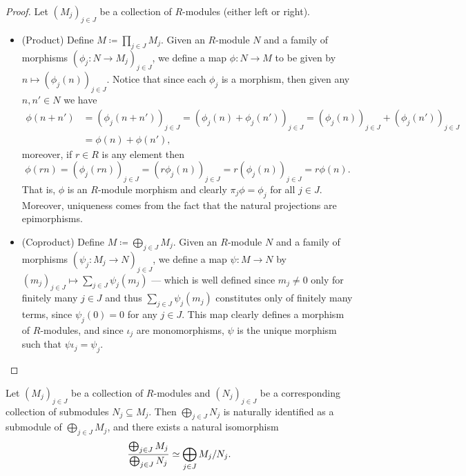 \begin{proof}
    Let \((M_j)_{j \in J}\) be a collection of \(R\)-modules (either left or
    right).
    \begin{itemize}\setlength\itemsep{0em}
        \item (Product) Define \(M \coloneq \prod_{j \in J} M_j\). Given an \(R\)-module
              \(N\) and a family of morphisms \((\phi_j: N \to M_j)_{j \in J}\), we define a
              map \(\phi: N \to M\) to be given by \(n \mapsto (\phi_j(n))_{j \in
                  J}\). Notice that since each \(\phi_j\) is a morphism, then given any
              \(n, n' \in N\) we have
              \begin{align*}
                  \phi(n + n')
                   & = (\phi_j(n + n'))_{j \in J}
                  = (\phi_j(n) + \phi_j(n'))_{j \in J}
                  = (\phi_j(n))_{j \in J} + (\phi_j(n'))_{j \in J} \\
                   & = \phi(n) + \phi(n'),
              \end{align*}
              moreover, if \(r \in R\) is any element then
              \[
                  \phi(r n)
                  = (\phi_j(r n))_{j \in J}
                  = (r \phi_j(n))_{j \in J}
                  = r (\phi_j(n))_{j \in J}
                  = r \phi(n).
              \]
              That is, \(\phi\) is an \(R\)-module morphism and clearly \(\pi_j \phi =
              \phi_j\) for all \(j \in J\). Moreover, uniqueness comes from the fact that
              the natural projections are epimorphisms.

        \item (Coproduct) Define \(M \coloneq \bigoplus_{j \in J} M_j\). Given an
              \(R\)-module \(N\) and a family of morphisms
              \((\psi_j: M_j \to N)_{j \in J}\), we define a map \(\psi: M \to N\) by
              \((m_j)_{j \in J} \mapsto \sum_{j \in J} \psi_j(m_j)\) --- which is well
              defined since \(m_j \neq 0\) only for finitely many \(j \in J\) and thus
              \(\sum_{j \in J} \psi_j(m_j)\) constitutes only of finitely many terms, since
              \(\psi_j(0) = 0\) for any \(j \in J\). This map clearly defines a morphism of
              \(R\)-modules, and since \(\iota_j\) are monomorphisms, \(\psi\) is the unique
              morphism such that \(\psi \iota_j = \psi_{j}\).
    \end{itemize}
\end{proof}

\begin{proposition}
    \label{prop:quotient-family-modules}
    Let \((M_j)_{j \in J}\) be a collection of \(R\)-modules and \((N_j)_{j \in J}\)
    be a corresponding collection of submodules \(N_j \subseteq M_j\). Then
    \(\bigoplus_{j \in J} N_j\) is naturally identified as a submodule of
    \(\bigoplus_{j \in J} M_j\), and there exists a natural isomorphism
    \[
        \frac{\bigoplus_{j \in J} M_j}{\bigoplus_{j \in J} N_j}
        \simeq
        \bigoplus_{j \in J} M_j/N_j.
    \]
\end{proposition}

